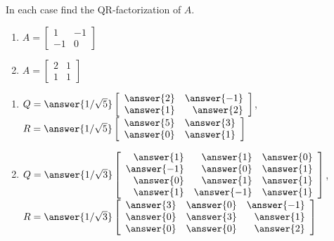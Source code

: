 \documentclass{ximera}
\author{Zack Reed}
\begin{document}
    
\begin{problem}\label{prob:findQR}
In each case find the QR-factorization of $A$.
    
\begin{enumerate}
\item $A = \left[ \begin{array}{rr}
1 & -1 \\
-1 & 0
\end{array}\right]$
\item $A = \left[ \begin{array}{rr}
2 & 1 \\
1 &1
\end{array}\right]$
\end{enumerate}


\begin{enumerate}
    \item  $Q = \answer{1/\sqrt{5}}\left[ \begin{array}{rr}
    \answer{2} & \answer{-1} \\
    \answer{1} & \answer{2}
    \end{array}\right]$,
        $R = \answer{1/\sqrt{5}}\left[ \begin{array}{rr}
    \answer{5} & \answer{3} \\
    \answer{0} & \answer{1}
    \end{array}\right]$
        
    \item  $Q = \answer{1/\sqrt{3}}\left[ \begin{array}{rrr}
    \answer{1} & \answer{1} & \answer{0} \\
    \answer{-1} & \answer{0} & \answer{1} \\
    \answer{0} & \answer{1} & \answer{1} \\
    \answer{1} & \answer{-1} & \answer{1}
    \end{array}\right]$, \\
    $R = \answer{1/\sqrt{3}}\left[ \begin{array}{rrr}
    \answer{3} & \answer{0} & \answer{-1} \\
    \answer{0} & \answer{3} & \answer{1} \\
    \answer{0} & \answer{0} & \answer{2}
    \end{array}\right]$
\end{enumerate}

\end{problem}
\end{document}

